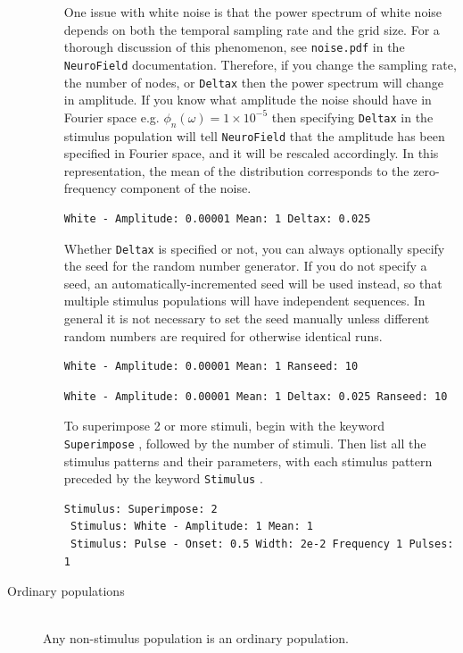 \documentclass[12pt,a4paper]{article}
\newcommand{\type}[1]{ {\small\small\tt #1} }
\newcommand{\NF}[0]{ \type{NeuroField}}
\begin{document}
\begin{description}
\begin{itemize}
    One issue with white noise is that the power spectrum of white noise depends on both the temporal sampling rate and the grid size. For a thorough discussion of this phenomenon, see \type{noise.pdf} in the \NF documentation. Therefore, if you change the sampling rate, the number of nodes, or \type{Deltax} then the power spectrum will change in amplitude. If you know what amplitude the noise should have in Fourier space e.g. $\phi_n(\omega) = 1 \times 10^{-5}$ then specifying \type{Deltax} in the stimulus population will tell \NF that the amplitude has been specified in Fourier space, and it will be rescaled accordingly. In this representation, the mean of the distribution corresponds to the zero-frequency component of the noise. 
    
	\begin{lstlisting}
White - Amplitude: 0.00001 Mean: 1 Deltax: 0.025
	\end{lstlisting}
	
	Whether \type{Deltax} is specified or not, you can always optionally specify the seed for the random number generator. If you do not specify a seed, an automatically-incremented seed will be used instead, so that multiple stimulus populations will have independent sequences. In general it is not necessary to set the seed manually unless different random numbers are required for otherwise identical runs. 

	\begin{lstlisting}
White - Amplitude: 0.00001 Mean: 1 Ranseed: 10
	\end{lstlisting}
	\begin{lstlisting}
White - Amplitude: 0.00001 Mean: 1 Deltax: 0.025 Ranseed: 10
	\end{lstlisting}

	To superimpose 2 or more stimuli, begin with the keyword \type{Superimpose}, followed by the number of stimuli. Then list all the stimulus patterns and their parameters, with each stimulus pattern preceded by the keyword \type{Stimulus}.
	\begin{lstlisting}
Stimulus: Superimpose: 2
 Stimulus: White - Amplitude: 1 Mean: 1
 Stimulus: Pulse - Onset: 0.5 Width: 2e-2 Frequency 1 Pulses: 1
	\end{lstlisting}

	\end{itemize}
\item[Ordinary populations]\ \\
	Any non-stimulus population is an ordinary population.


\end{description}
\end{document}
